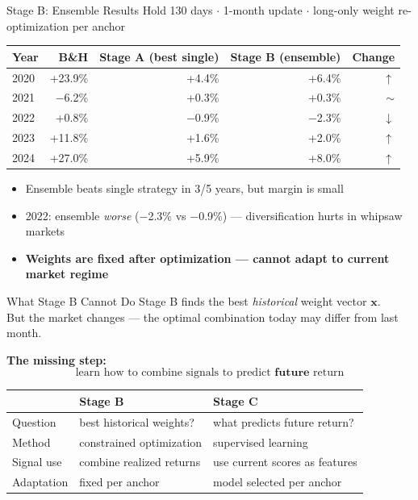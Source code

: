 \documentclass[aspectratio=169]{beamer}
\begin{document}
\begin{frame}{Stage B: Ensemble Results}
  \small
  Hold 130 days $\cdot$ 1-month update $\cdot$ long-only weight re-optimization per anchor

  \vspace{0.4em}
  \begin{tabular}{lrrrr}
    \toprule
    Year & B\&H & Stage A (best single) & Stage B (ensemble) & Change \\
    \midrule
    2020 & +23.9\% & +4.4\% & +6.4\% & $\uparrow$ \\
    2021 & $-$6.2\%  & +0.3\% & +0.3\% & $\sim$ \\
    2022 & +0.8\%  & $-$0.9\% & $-$2.3\% & $\downarrow$ \\
    2023 & +11.8\% & +1.6\% & +2.0\% & $\uparrow$ \\
    2024 & +27.0\% & +5.9\% & +8.0\% & $\uparrow$ \\
    \bottomrule
  \end{tabular}

  \vspace{0.5em}
  \begin{itemize}
    \item Ensemble beats single strategy in 3/5 years, but margin is small
    \item 2022: ensemble \emph{worse} ($-$2.3\% vs $-$0.9\%) --- diversification hurts in whipsaw markets
    \item \textbf{Weights are fixed after optimization — cannot adapt to current market regime}
  \end{itemize}
\end{frame}

\begin{frame}{What Stage B Cannot Do}
  Stage B finds the best \emph{historical} weight vector \(\mathbf{x}\).\\
  But the market changes — the optimal combination today may differ from last month.

  \vspace{0.5em}
  \textbf{The missing step:}
  \[
    \text{learn how to combine signals to predict } \textbf{future} \text{ return}
  \]

  \vspace{0.5em}
  \begin{tabular}{lll}
    \toprule
    & Stage B & Stage C \\
    \midrule
    Question    & best historical weights? & what predicts future return? \\
    Method      & constrained optimization & supervised learning \\
    Signal use  & combine realized returns & use current scores as features \\
    Adaptation  & fixed per anchor         & model selected per anchor \\
    \bottomrule
  \end{tabular}
\end{frame}
\end{document}
